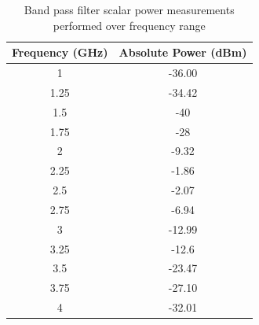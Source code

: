 \documentclass[journal]{IEEEtran}
\begin{document}
\begin{table}[htbp]
    \centering
    \caption{Band pass filter scalar power measurements performed over frequency range
    \label{table:filter}
    }
    \begin{tabular}{|c|c|}
        \hline
        \textbf{Frequency (GHz)} & \textbf{Absolute Power (dBm)} \\ \hline
        1                        & -36.00                        \\ \hline
        1.25                     & -34.42                        \\ \hline
        1.5                      & -40                           \\ \hline
        1.75                     & -28                           \\ \hline
        2                        & -9.32                         \\ \hline
        2.25                     & -1.86                         \\ \hline
        2.5                      & -2.07                         \\ \hline
        2.75                     & -6.94                         \\ \hline
        3                        & -12.99                        \\ \hline
        3.25                     & -12.6                         \\ \hline
        3.5                      & -23.47                        \\ \hline
        3.75                     & -27.10                        \\ \hline
        4                        & -32.01                        \\ \hline
    \end{tabular}
    
\end{table}



\end{document}
